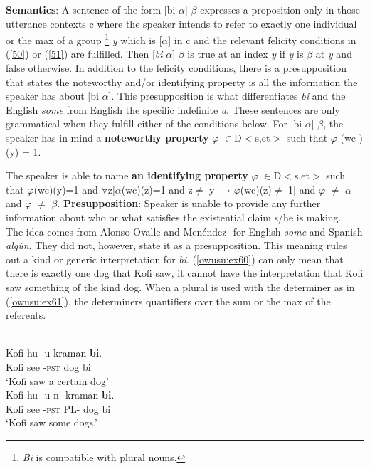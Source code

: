 \documentclass[output=paper,modfonts,nonflat,draftmode]{langsci/langscibook}
\begin{document}
\textbf{Semantics}: A sentence of the form [bi $\alpha$] $\beta$ expresses a proposition only in those utterance contexts c where the speaker intends to refer to exactly one individual or the max of a group \footnote{\emph{Bi} is compatible with plural nouns.} \emph{y} which is [$\alpha$] in c and the relevant felicity conditions in (\ref{50}) or (\ref{51}) are fulfilled. Then [\emph{bi} $\alpha$] $\beta$ is true at an index \emph{y} if \emph{y} is $\beta$ at \emph{y} and false otherwise. In addition to the felicity conditions, there is a presupposition that states the noteworthy and/or identifying property is all the information the speaker has about [bi $\alpha$]. This presupposition is what differentiates \emph{bi} and the English \emph{some} from English the specific indefinite \emph{a}.   
These sentences are only grammatical when they fulfill either of the conditions below. 
\ea
\ea \label{50} For [bi $\alpha$] $\beta$, the speaker has in mind a \textbf{noteworthy property} $\varphi$ $\in$D$<$s,et$>$ such that $\varphi$ (wc )(y) = 1.

\ex \label{51} The speaker is able to name \textbf{an identifying property} $\varphi$ $\in$D$<$s,et$>$ such that $\varphi$(wc)(y)=1 and $\forall$z[$\alpha$(wc)(z)=1 and z$\neq$ y] → $\varphi$(wc)(z)$\neq$ 1] and $\varphi$ $\neq$ $\alpha$ and $\varphi$ $\neq$ $\beta$.
\ex \textbf{Presupposition}: Speaker is unable to provide any further information about who or what satisfies the existential claim s/he is making.\\ The idea comes from Alonso-Ovalle and Menéndez-\citet{Benito2003} for English \emph{some} and Spanish \emph{alg\'un}. They did not, however, state it as a presupposition.  
\z \z This meaning rules out a kind or generic interpretation for \emph{bi}. (\ref{owusu:ex60}) can only mean that there is exactly one dog that Kofi saw, it cannot have the interpretation that Kofi saw something of the kind dog. When a plural is used with the determiner as in (\ref{owusu:ex61}), the determiners quantifiers over the sum or the max of the referents.

\ea {}\\
\ea\label{owusu:ex60}
\gll Kofi hu -u kraman \textbf{bi}.\\
Kofi see -\textsc{pst} dog bi\\
\glt `Kofi saw a certain dog'\\
	
\ex \label{owusu:ex61}
\gll Kofi hu -u n-  kraman \textbf{bi}.\\
     Kofi see -\textsc{pst} PL- dog bi\\
\glt     `Kofi saw some dogs.' 
\end{document}
